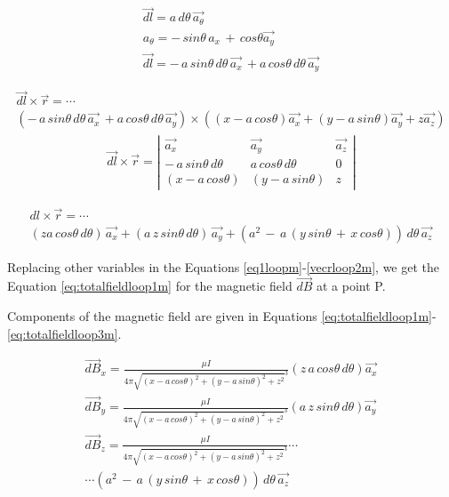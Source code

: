 \documentclass{ximera}
\begin{document}
\begin{eqnarray}
\vec{dl}=  a\,  d\theta \, \vec{ a_{\theta}} \\
a_{\theta}= -\, sin\theta \, a_{x} \, + \, cos\theta \vec{a_y}  \\
\vec{dl}= -\, a \,  sin\theta \, d \theta \, \vec{a_{x}} \, + a \, cos \theta\,  d \theta \,\vec{a_y} 
\end{eqnarray}

\begin{eqnarray}\label{eq:cprloop} 
\vec{dl} \times \vec{r} = \cdots \nonumber \\ 
 \left( -\, a \,  sin\theta \, d \theta \, \vec{a_{x}} \, + a \, cos \theta\,  d \theta \,\vec{a_y}\right)  \times \left(  (x -  a \,cos{\theta}) \vec{a_x} +(y - a \,sin{\theta}) \vec{a_y} +z \vec{a_z} \right) 
\end{eqnarray}
\begin{eqnarray}\label{eq:product}
\vec{dl} \times \vec{r} =\left| \begin{array}{ccc}
\vec{a_x} & \vec{a_y} & \vec{a_z} \\
   -\, a \,  sin\theta \, d \theta &  a \, cos \theta\,  d \theta & 0 \\
 (x -  a \,cos{\theta}) & (y - a \,sin{\theta})  & z \end{array} \right| 
\end{eqnarray}

\begin{eqnarray}
dl\times \vec{r} =\cdots \nonumber \\ (z a \, cos\theta \,d\theta) \,\vec{a_x}  + (a\, z \,sin\theta \,d\theta) \,\vec{a_y} + (a^2 \,-\,a \,(y\, sin\theta\, +\, x \,cos\theta))\, d\theta \,\vec{a_z} 
\end{eqnarray}


Replacing other variables in the Equations \ref{eq1loopm}-\ref{vecrloop2m}, we get the    Equation \ref{eq:totalfieldloop1m} for the magnetic field $\vec{dB}$ at a point P.

Components of the magnetic field are given in Equations \ref{eq:totalfieldloop1m}-\ref{eq:totalfieldloop3m}.

\begin{eqnarray}
\label{eq:totalfieldloop1m} \vec{dB}_x = \frac{\mu I}{4 \pi \sqrt{(x - a \,cos{\theta})^2 +(y - a \,sin{\theta})^2 +z ^2}^3 } (z \, a \, cos\theta \, d\theta) \vec{a_x}    \\
\label{eq:totalfieldloop2m}  \vec{dB}_y= \frac{\mu I}{4 \pi \sqrt{(x - a \,cos{\theta})^2 +(y - a \,sin{\theta})^2 +z ^2}^3 } (a \, z \, sin\theta \, d\theta) \vec{a_y} \\
 \label{eq:totalfieldloop3m}\vec{dB}_z=  
\frac{\mu I}{4 \pi \sqrt{(x - a \,cos{\theta})^2 +(y - a \,sin{\theta})^2 +z ^2}^3 } \cdots \nonumber \\ \cdots (a^2 \, -\, a \, (y\,  sin\theta\, + \,x\, cos\theta)) \, d\theta \, \vec{a_z} 
\end{eqnarray}
\end{document}
